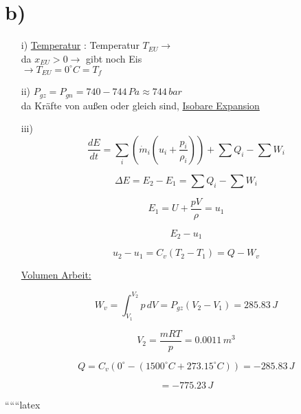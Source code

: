 

\section*{b)}

\begin{itemize}
    \item[i)] \underline{Temperatur} : Temperatur $T_{EU} \rightarrow$ \\
    da $x_{EU} > 0 \rightarrow$ gibt noch Eis \\
    $\rightarrow T_{EU} = 0^\circ C = T_f$
    
    \item[ii)] $P_{gz} = P_{gn} = 740 - 744 \, Pa \approx 744 \, bar$ \\
    da Kräfte von außen oder gleich sind, \underline{Isobare Expansion}
    
    \item[iii)] 
    \begin{equation*}
        \frac{dE}{dt} = \sum_i (\dot{m}_i (u_i + \frac{p_i}{\rho_i})) + \sum Q_i - \sum W_i
    \end{equation*}
    
    \begin{equation*}
        \Delta E = E_2 - E_1 = \sum Q_i - \sum W_i
    \end{equation*}
    
    \begin{equation*}
        E_1 = U + \frac{pV}{\rho} = u_1
    \end{equation*}
    
    \begin{equation*}
        E_2 - u_1
    \end{equation*}
    
    \begin{equation*}
        u_2 - u_1 = C_v (T_2 - T_1) = Q - W_v
    \end{equation*}
    
    \underline{Volumen Arbeit:}
    
    \begin{equation*}
        W_v = \int_{V_1}^{V_2} p \, dV = P_{gz} (V_2 - V_1) = 285.83 \, J
    \end{equation*}
    
    \begin{equation*}
        V_2 = \frac{mRT}{p} = 0.0011 \, m^3
    \end{equation*}
    
    \begin{equation*}
        Q = C_v (0^\circ - (1500^\circ C + 273.15^\circ C)) = -285.83 \, J
    \end{equation*}
    
    \begin{equation*}
        = -775.23 \, J
    \end{equation*}
\end{itemize}

``````latex